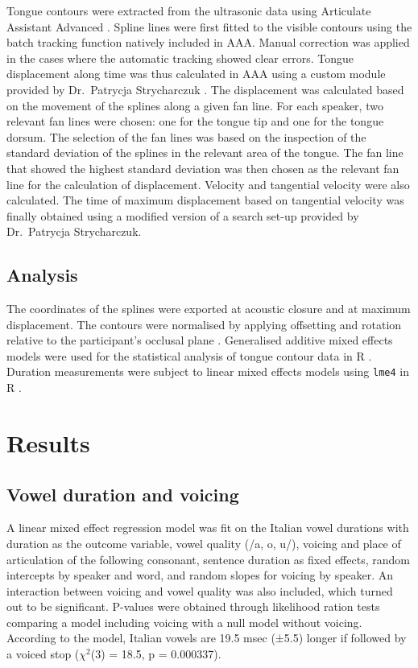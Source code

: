 \documentclass[authoryear, twocolumn]{elsarticle}
\begin{document}
Tongue contours were extracted from the ultrasonic data using Articulate
Assistant Advanced \citep[AAA,][]{articulate2011}. Spline lines were
first fitted to the visible contours using the batch tracking function
natively included in AAA. Manual correction was applied in the cases
where the automatic tracking showed clear errors. Tongue displacement
along time was thus calculated in AAA using a custom module provided by
Dr.~Patrycja Strycharczuk \citep{Strycharczuk2015}. The displacement was
calculated based on the movement of the splines along a given fan line.
For each speaker, two relevant fan lines were chosen: one for the tongue
tip and one for the tongue dorsum. The selection of the fan lines was
based on the inspection of the standard deviation of the splines in the
relevant area of the tongue. The fan line that showed the highest
standard deviation was then chosen as the relevant fan line for the
calculation of displacement. Velocity and tangential velocity were also
calculated. The time of maximum displacement based on tangential
velocity was finally obtained using a modified version of a search
set-up provided by Dr.~Patrycja Strycharczuk.

\subsection{Analysis}\label{analysis}

The coordinates of the splines were exported at acoustic closure and at
maximum displacement. The contours were normalised by applying
offsetting and rotation relative to the participant's occlusal plane
\citep{scobbie2011}. Generalised additive mixed effects models
\citep{wood2006} were used for the statistical analysis of tongue
contour data in R \citep{r-core-team2017}. Duration measurements were
subject to linear mixed effects models using \texttt{lme4} in R
\citep{bates2015}.

\section{Results}\label{results}

\subsection{Vowel duration and
voicing}\label{vowel-duration-and-voicing}

A linear mixed effect regression model was fit on the Italian vowel
durations with duration as the outcome variable, vowel quality (/a, o,
u/), voicing and place of articulation of the following consonant,
sentence duration as fixed effects, random intercepts by speaker and
word, and random slopes for voicing by speaker. An interaction between
voicing and vowel quality was also included, which turned out to be
significant. P-values were obtained through likelihood ration tests
comparing a model including voicing with a null model without voicing.
According to the model, Italian vowels are 19.5 msec (±5.5) longer if
followed by a voiced stop (\(\chi^2\)(3) = 18.5, p = 0.000337).
\end{document}
